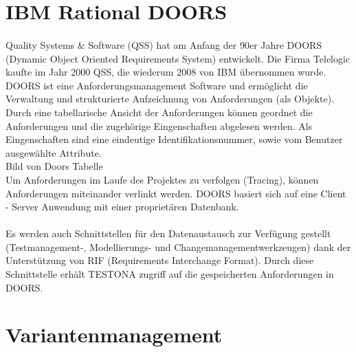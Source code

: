 \section{IBM Rational DOORS}\label{sec:DOORS}
\paragraph{}


Quality Systems \& Software (QSS) hat am Anfang der 90er Jahre DOORS (Dynamic Object Oriented Requirements System) entwickelt. Die Firma Telelogic kaufte im Jahr 2000 QSS, die wiederum 2008 von IBM übernommen wurde. DOORS ist eine Anforderungsmanagement Software und ermöglicht die Verwaltung und strukturierte Aufzeichnung von Anforderungen (als Objekte). Durch eine tabellarische Ansicht der Anforderungen können geordnet die Anforderungen und die zugehörige Eingenschaften abgelesen werden. Als Eingenschaften sind eine eindeutige Identifikationsnummer, sowie vom Benutzer ausgewählte Attribute.\\

Bild von Doors Tabelle
\\

Um Anforderungen im Laufe des Projektes zu verfolgen (Tracing), können Anforderungen miteinander verlinkt werden. DOORS basiert sich auf eine Client - Server Anwendung mit einer proprietären Datenbank. \\
\\
Es werden auch Schnittstellen für den Datenaustausch zur Verfügung gestellt (Testmanagement-, Modellierungs- und Changemanagementwerkzeugen) dank der Unterstützung von RIF (Requirements Interchange Format). Durch diese Schnittstelle erhält TESTONA zugriff auf die gespeicherten Anforderungen in DOORS. \cite{Doors} \cite{Anforderungsmanagement}\\

\section{Variantenmanagement}\label{sec:VarManag}
